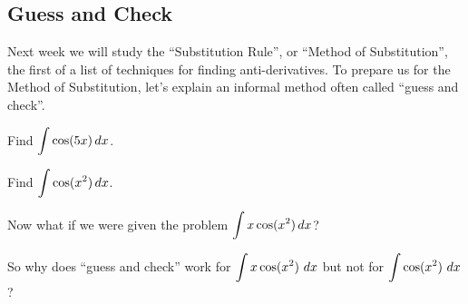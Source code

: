 \newpage
\subsection*{Guess and Check}{}
Next week we will study the ``Substitution Rule'', or ``Method of
Substitution'', the first of a list of techniques for finding
anti-derivatives. To prepare us for the Method of Substitution, let's
explain an informal method often called ``guess and check''.

\begin{problem}
	Find $\displaystyle \int \cos (5x)\,dx$.
	
\end{problem}

\newpage
\begin{problem}
	Find $\displaystyle \int \cos (x^2)\,dx$.
	
\end{problem}

\newpage

\begin{problem}
Now what if we were given the problem $\displaystyle \int x\cos (x^2)\,dx$?
\end{problem}


\vfill

So why does ``guess and check'' work for $\displaystyle \int x \cos(x^2)~dx$ but
not for $\displaystyle \int \cos(x^2)~dx$?
\vspace{1in}



